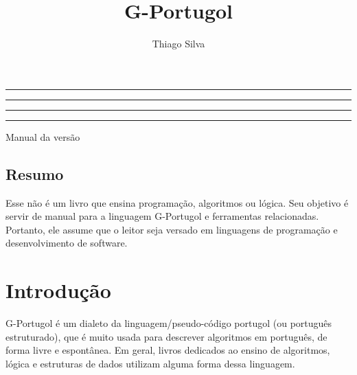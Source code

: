 \documentclass[a4paper,11pt]{report}
\title{G-Portugol}
\author{Thiago Silva}
\makeatletter
\renewcommand{\headrulewidth}{0.4pt}
\renewcommand{\footrulewidth}{0.4pt}
\renewcommand{\headrulewidth}{0pt}
\renewcommand{\maketitle}{
  \begin{center}
    \null\vfill
    \hrule\vskip 2pt\hrule\vskip 10pt
    {\huge \bfseries \@title \par}
    \vskip 10pt\hrule\vskip 2pt\hrule
    \vskip 20pt
    {\Large Manual da versão \@version \par}
    \vfill
    \begin{flushright}
        {\Large \@author \par}
        {\Large \@email \par}
        \vskip 20pt
        {\Large \@date \par}
    \end{flushright}
    \vfill
  \end{center}
  \clearpage
}
\makeatother
\begin{document}


\maketitle


\cleardoublepage
\begingroup
  \fancypagestyle{plain}{
    \fancyhf{}
    \renewcommand{\headrulewidth}{0pt}
    \renewcommand{\footrulewidth}{0pt}
  }
  \let\oldtableofcontents\tableofcontents
  \renewcommand{\tableofcontents}{
    \oldtableofcontents
    \thispagestyle{empty}
  }
  \tableofcontents
\endgroup
\cleardoublepage


\section*{Resumo}
\thispagestyle{empty}

Esse não é um livro que ensina programação, algoritmos ou lógica. Seu objetivo é
servir de manual para a linguagem G-Portugol e ferramentas relacionadas.
Portanto, ele assume que o leitor seja versado em linguagens de programação e
desenvolvimento de software.

\clearpage

\pagestyle{fancy}


\chapter{Introdução}

G-Portugol é um dialeto da linguagem/pseudo-código portugol (ou português
estruturado), que é muito usada para descrever algoritmos em português, de forma
livre e espontânea. Em geral, livros dedicados ao ensino de algoritmos, lógica e
estruturas de dados utilizam alguma forma dessa linguagem.
\end{document}
